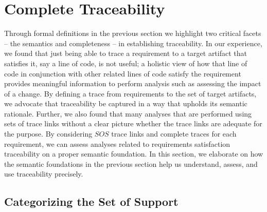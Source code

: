 \section{Complete Traceability}
\label{sec:discussion}

Through formal definitions in the previous section we highlight two critical facets -- the semantics and completeness -- in establishing traceability. In our experience, we found that just being able to trace a requirement to a target artifact that satisfies it, say a line of code, is not useful; a holistic view of how that line of code in conjunction with other related lines of code satisfy the requirement provides meaningful information to perform analysis such as assessing the impact of a change. By defining a trace from requirements to the set of target artifacts, we advocate that traceability be captured in a way that upholds its semantic rationale. Further, we also found that many analyses that are performed using sets of trace links without a clear picture whether the trace links are adequate for the purpose.  By considering $SOS$ trace links and complete traces for each requirement, we can assess analyses related to requirements satisfaction traceability on a proper semantic foundation.  In this section, we elaborate on how the semantic foundations in the previous section help us understand, assess, and use traceability precisely.


\subsection{Categorizing the Set of Support}

